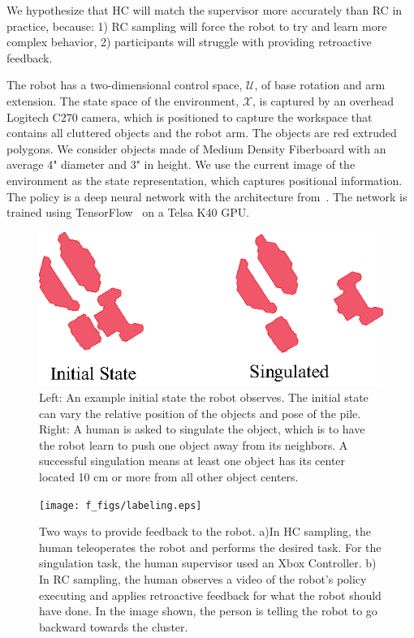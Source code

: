 \documentclass[10pt, conference]{ieeeconf}      %
\begin{document}
We hypothesize that HC will match the supervisor more accurately than RC in practice, because: 1)
RC sampling will force the robot to try and learn more
complex behavior, 2) participants will struggle with providing
retroactive feedback.

The robot has a two-dimensional control space, $\mathcal{U}$, of base rotation and arm extension. The state space of the environment, $\mathcal{X}$, is captured by an overhead Logitech C270 camera, which is positioned to capture the workspace that contains all cluttered objects and the robot arm.  The objects are red extruded polygons. We consider objects made of Medium Density Fiberboard with an average 4" diameter and 3" in height.  We use the current image of the environment as the state representation, which captures positional information. The policy is a deep neural network with the architecture from~\cite{laskeyrobot}. The network is trained using TensorFlow~\cite{tensor} on a Telsa K40 GPU. 

\begin{figure}
\centering
\includegraphics{f_figs/singulation.eps}
\caption{
    \footnotesize
Left: An example initial state the robot observes. The initial state can vary the relative position of the objects and pose of the pile. Right: A human is asked to singulate the object, which is to have the robot learn to push one object away from its neighbors. A successful singulation means at least one object has its center located 10 cm or more from all other object centers.   }

\label{fig:izzy_sing}
\end{figure}


\begin{figure}
\centering
\texttt{[image: f\_figs/labeling.eps]}
\caption{
    \footnotesize
Two ways to provide feedback to the robot. a)In HC sampling, the human teleoperates the robot and performs the desired task. For the singulation task, the human supervisor used an Xbox Controller. b) In RC sampling, the human observes a video of the robot's policy executing and applies retroactive feedback for what the robot should have done. In the image shown, the person is telling the robot to go backward towards the cluster.  }
\vspace{-20pt}
\label{fig:labeling}
\end{figure}
\end{document}
